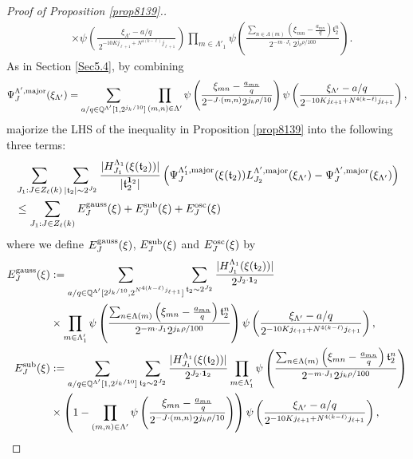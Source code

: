 \documentclass[11 pt,letterpaper]{amsart}
\theoremstyle{plain}
\theoremstyle{definition}
\theoremstyle{remark} \theoremstyle{exam} \theoremstyle{ob}
\numberwithin{equation}{section}
\begin{document}
\begin{proof}[Proof of Proposition \ref{prop8139}.]
\begin{align*}
&\times \psi\!\left(
\frac{\xi_{\Lambda'}-a/q}{\,2^{-10K j_{\ell+1}+ N^{4(k-\ell)}j_{\ell+1}}}
\right)
\prod_{m\in \Lambda'_1}
\psi\!\left(
\frac{
\sum_{n\in\Lambda(m)}
\left( \xi_{mn}-\frac{a_{mn}}{q}\right)
\mathfrak{t}_2^{n}
}{
2^{-m\cdot J_1}\,2^{j_k\rho/100}
}
\right).
\end{align*}
As in Section \ref{Sec5.4},  by combining
$$
\Psi^{\Lambda',\rm{major}}_{J}(\xi_{\Lambda'})=\sum_{ a/q\in \mathbb{Q}^{\Lambda'}[1,2^{j_k/10}]} \prod_{(m,n)\in \Lambda'} \psi\left(  \frac{  \xi_{mn}-\frac{a_{mn}}{q}}{2^{-J\cdot (m,n)}2^{j_k\rho/10}} \right)\psi\left(\frac{\xi_{\Lambda'}-a/q}{2^{-10Kj_{\ell+1}+N^{4(k-\ell)}j_{\ell+1} }}\right) ,$$    majorize the LHS of the inequality in Proposition \ref{prop8139} into the following three terms:
\begin{align*}
	&\sum_{J_1: J\in Z_{\ell}(k)}  \sum_{|\mathfrak{t}_2|\sim 2^{J_2}}    \frac{|H^{\Lambda_1}_{J_1}(\xi(\mathfrak{t}_2))|}{|\mathfrak{t}_2^{{\bf 1}_2}|}  \left(\Psi^{\Lambda_1',\rm{major}}_{J}(\xi(\mathfrak{t}_2))L^{\Lambda',\rm{major}}_{J_2}(\xi_{\Lambda'})-\Psi^{\Lambda',\rm{major}}_{J}(\xi_{\Lambda'})\right) \\
	&\le \sum_{J_1: J\in Z_{\ell}(k)} E_J^{\rm{gauss}}(\xi)+E_J^{\rm{sub}}(\xi) +E_J^{\rm{osc}}(\xi) 
\end{align*}
where     we define $E_J^{\rm{gauss}}(\xi)$, $E_J^{\rm{sub}}(\xi)$ and $E_J^{\rm{osc}}(\xi)$ by 
\begin{align*}
	E^{\rm{gauss}}_J(\xi)&:= \sum_{ a/q\in \mathbb{Q}^{\Lambda'}[2^{j_k/10},2^{N^{4(k-\ell)} j_{\ell+1} }]}  \sum_{\mathfrak{t}_2\sim  2^{J_2}}    \frac{|H^{\Lambda_{1}}_{J_1}(\xi(\mathfrak{t}_2))|}{2^{J_2\cdot {\bf 1}_2}} \nonumber  \\
	&  \times \prod_{m\in\Lambda'_{1}}\psi\left( \frac{\sum_{n\in\Lambda(m)}\left( \xi_{mn}-\frac{a_{mn}}{q} \right)\mathfrak{t}_2^n }{2^{-m\cdot J_1} 2^{ j_k\rho/100}} \right)\psi\left(\frac{\xi_{\Lambda'}-a/q}{2^{-10Kj_{\ell+1}+N^{4(k-\ell)}j_{\ell+1}}}\right),\nonumber\\
	E^{\rm{sub}}_J(\xi)&:=  \sum_{ a/q\in \mathbb{Q}^{\Lambda'}[1,2^{j_k/10}]}   \sum_{\mathfrak{t}_2\sim  2^{J_2}}    \frac{|H^{\Lambda_{1}}_{J_1}(\xi(\mathfrak{t}_2))|}{2^{J_2\cdot {\bf 1}_2}}  \prod_{m\in\Lambda'_{1}}\psi\left( \frac{\sum_{n\in\Lambda(m)}\left( \xi_{mn}-\frac{a_{mn}}{q} \right)\mathfrak{t}_2^n }{2^{-m\cdot J_1} 2^{ j_k\rho/100}} \right)
	\nonumber \\
	&\times   \left(1-\prod_{(m,n)\in\Lambda'}\psi\left(  \frac{  \xi_{mn}-\frac{a_{mn}}{q}}{ 2^{-J\cdot (m,n)}2^{j_k\rho/10}} \right)\right)\psi\left(\frac{\xi_{\Lambda'}-a/q}{2^{-10Kj_{\ell+1}+N^{4(k-\ell)}j_{\ell+1} }}\right),\\

\end{align*}
\end{proof}
\end{document}
